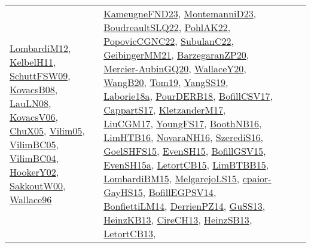 {\begin{longtable}{lp{3cm}>{\raggedright}p{6cm}>{\raggedright}p{6cm}p{8cm}}
\href{articles/LombardiM12.pdf}{LombardiM12}\cite{LombardiM12}, \href{articles/KelbelH11.pdf}{KelbelH11}\cite{KelbelH11}, \href{papers/SchuttFSW09.pdf}{SchuttFSW09}\cite{SchuttFSW09}, \href{articles/KovacsB08.pdf}{KovacsB08}\cite{KovacsB08}, \href{papers/LauLN08.pdf}{LauLN08}\cite{LauLN08}, \href{papers/KovacsV06.pdf}{KovacsV06}\cite{KovacsV06}, \href{papers/ChuX05.pdf}{ChuX05}\cite{ChuX05}, \href{papers/Vilim05.pdf}{Vilim05}\cite{Vilim05}, \href{articles/VilimBC05.pdf}{VilimBC05}\cite{VilimBC05}, \href{papers/VilimBC04.pdf}{VilimBC04}\cite{VilimBC04}, \href{papers/HookerY02.pdf}{HookerY02}\cite{HookerY02}, \href{articles/SakkoutW00.pdf}{SakkoutW00}\cite{SakkoutW00}, \href{articles/Wallace96.pdf}{Wallace96}\cite{Wallace96} & \href{papers/KameugneFND23.pdf}{KameugneFND23}\cite{KameugneFND23}, \href{articles/MontemanniD23.pdf}{MontemanniD23}\cite{MontemanniD23}, \href{papers/BoudreaultSLQ22.pdf}{BoudreaultSLQ22}\cite{BoudreaultSLQ22}, \href{articles/PohlAK22.pdf}{PohlAK22}\cite{PohlAK22}, \href{papers/PopovicCGNC22.pdf}{PopovicCGNC22}\cite{PopovicCGNC22}, \href{articles/SubulanC22.pdf}{SubulanC22}\cite{SubulanC22}, \href{papers/GeibingerMM21.pdf}{GeibingerMM21}\cite{GeibingerMM21}, \href{papers/BarzegaranZP20.pdf}{BarzegaranZP20}\cite{BarzegaranZP20}, \href{papers/Mercier-AubinGQ20.pdf}{Mercier-AubinGQ20}\cite{Mercier-AubinGQ20}, \href{articles/WallaceY20.pdf}{WallaceY20}\cite{WallaceY20}, \href{papers/WangB20.pdf}{WangB20}\cite{WangB20}, \href{papers/Tom19.pdf}{Tom19}\cite{Tom19}, \href{papers/YangSS19.pdf}{YangSS19}\cite{YangSS19}, \href{papers/Laborie18a.pdf}{Laborie18a}\cite{Laborie18a}, \href{articles/PourDERB18.pdf}{PourDERB18}\cite{PourDERB18}, \href{papers/BofillCSV17.pdf}{BofillCSV17}\cite{BofillCSV17}, \href{papers/CappartS17.pdf}{CappartS17}\cite{CappartS17}, \href{papers/KletzanderM17.pdf}{KletzanderM17}\cite{KletzanderM17}, \href{papers/LiuCGM17.pdf}{LiuCGM17}\cite{LiuCGM17}, \href{papers/YoungFS17.pdf}{YoungFS17}\cite{YoungFS17}, \href{papers/BoothNB16.pdf}{BoothNB16}\cite{BoothNB16}, \href{papers/LimHTB16.pdf}{LimHTB16}\cite{LimHTB16}, \href{articles/NovaraNH16.pdf}{NovaraNH16}\cite{NovaraNH16}, \href{papers/SzerediS16.pdf}{SzerediS16}\cite{SzerediS16}, \href{articles/GoelSHFS15.pdf}{GoelSHFS15}\cite{GoelSHFS15}, \href{papers/EvenSH15.pdf}{EvenSH15}\cite{EvenSH15}, \href{papers/BofillGSV15.pdf}{BofillGSV15}\cite{BofillGSV15}, \href{articles/EvenSH15a.pdf}{EvenSH15a}\cite{EvenSH15a}, \href{articles/LetortCB15.pdf}{LetortCB15}\cite{LetortCB15}, \href{papers/LimBTBB15.pdf}{LimBTBB15}\cite{LimBTBB15}, \href{papers/LombardiBM15.pdf}{LombardiBM15}\cite{LombardiBM15}, \href{papers/MelgarejoLS15.pdf}{MelgarejoLS15}\cite{MelgarejoLS15}, \href{papers/cpaior-GayHS15.pdf}{cpaior-GayHS15}\cite{cpaior-GayHS15}, \href{papers/BofillEGPSV14.pdf}{BofillEGPSV14}\cite{BofillEGPSV14}, \href{papers/BonfiettiLM14.pdf}{BonfiettiLM14}\cite{BonfiettiLM14}, \href{papers/DerrienPZ14.pdf}{DerrienPZ14}\cite{DerrienPZ14}, \href{papers/GuSS13.pdf}{GuSS13}\cite{GuSS13}, \href{papers/HeinzKB13.pdf}{HeinzKB13}\cite{HeinzKB13}, \href{papers/CireCH13.pdf}{CireCH13}\cite{CireCH13}, \href{articles/HeinzSB13.pdf}{HeinzSB13}\cite{HeinzSB13}, \href{papers/LetortCB13.pdf}{LetortCB13}\cite{LetortCB13}, 
\end{longtable}}
